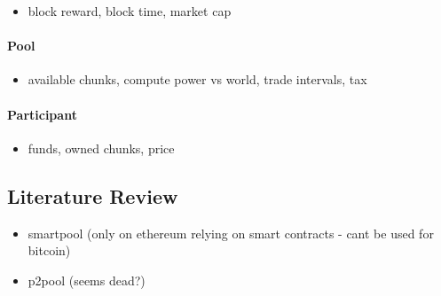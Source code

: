 \begin{itemize}
  \item block reward, block time, market cap
\end{itemize}


\paragraph{Pool}

\begin{itemize}
  \item available chunks, compute power vs world, trade intervals, tax
\end{itemize}

\paragraph{Participant}

\begin{itemize}
  \item funds, owned chunks, price
\end{itemize}

\subsection{Literature Review} %

\begin{itemize}
  \item smartpool (only on ethereum relying on smart contracts - cant be used for bitcoin)
  \item p2pool (seems dead?)
\end{itemize}